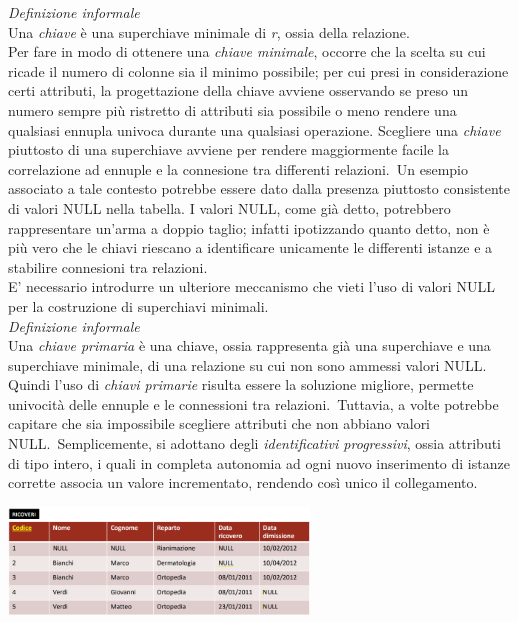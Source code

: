 \documentclass{article}
\begin{document}
\textit{Definizione informale}\\ Una \textit{chiave} è una superchiave minimale di \textit{r}, ossia della relazione. \vspace{14pt}\\
Per fare in modo di ottenere una \textit{chiave minimale}, occorre che la scelta su cui ricade il numero di colonne sia il minimo possibile; per cui presi in considerazione certi attributi, la progettazione della chiave avviene osservando se preso un numero sempre più ristretto di attributi sia possibile o meno rendere una qualsiasi ennupla univoca durante una qualsiasi operazione. Scegliere una \textit{chiave} piuttosto di una superchiave avviene per rendere maggiormente facile la correlazione ad ennuple e la connesione tra differenti relazioni.\ Un esempio associato a tale contesto potrebbe essere dato dalla presenza piuttosto consistente di valori NULL nella tabella. I valori NULL, come già detto, potrebbero rappresentare un'arma a doppio taglio; infatti ipotizzando quanto detto, non è più vero che le chiavi riescano a identificare unicamente le differenti istanze e a stabilire connesioni tra relazioni.\\
E' necessario introdurre un ulteriore meccanismo che vieti l'uso di valori NULL per la costruzione di superchiavi minimali.\vspace{14pt}\\
\textit{Definizione informale}\\Una \textit{chiave primaria} è una chiave, ossia rappresenta già una superchiave e una superchiave minimale, di una relazione su cui non sono ammessi valori NULL.\vspace{14pt}\\
Quindi l'uso di \textit{chiavi primarie} risulta essere la soluzione migliore, permette univocità delle ennuple e le connessioni tra relazioni.\ Tuttavia, a volte potrebbe capitare che sia impossibile scegliere attributi che non abbiano valori NULL.\ Semplicemente, si adottano degli \textit{identificativi progressivi}, ossia attributi di tipo intero, i quali in completa autonomia ad ogni nuovo inserimento di istanze corrette associa un valore incrementato, rendendo così unico il collegamento.
\begin{center}
    \includegraphics[width = 0.6\textwidth]{foto 4.png}
\end{center}
\end{document}
